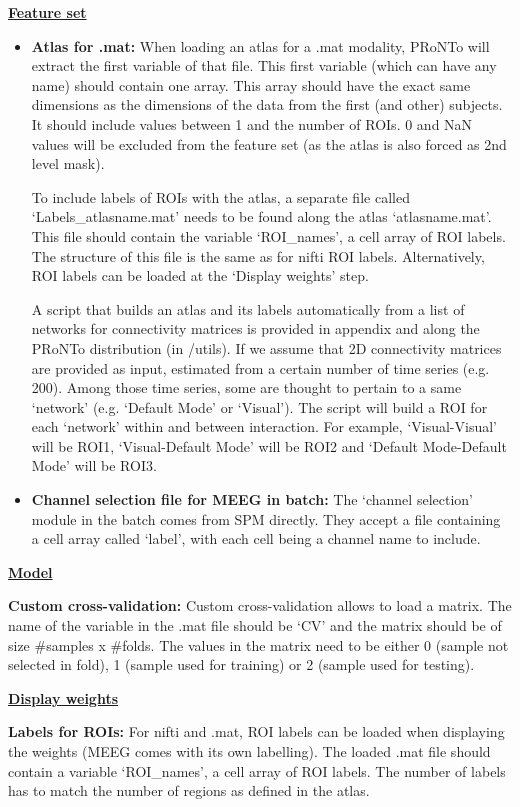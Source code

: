 \noindent \underline{\textbf{Feature set}}

\begin{itemize}

\item \textbf{Atlas for .mat:} When loading an atlas for a .mat modality, PRoNTo will extract the first variable of that file. This first variable (which can have any name) should contain one array. This array should have the exact same dimensions as the dimensions of the data from the first (and other) subjects. It should include values between 1 and the number of ROIs. 0 and NaN values will be excluded from the feature set (as the atlas is also forced as 2nd level mask).

To include labels of ROIs with the atlas, a separate file called `Labels\_atlasname.mat' needs to be found along the atlas `atlasname.mat'. This file should contain the variable `ROI\_names', a cell array of ROI labels. The structure of this file is the same as for nifti ROI labels. Alternatively, ROI labels can be loaded at the `Display weights' step.

A script that builds an atlas and its labels automatically from a list of networks for connectivity matrices is provided in appendix and along the PRoNTo distribution (in /utils). If we assume that 2D connectivity matrices are provided as input, estimated from a certain number of time series (e.g. 200). Among those time series, some are thought to pertain to a same `network' (e.g. `Default Mode' or `Visual'). The script will build a ROI for each `network' within and between interaction. For example, `Visual-Visual' will be ROI1, `Visual-Default Mode' will be ROI2 and `Default Mode-Default Mode' will be ROI3.

\item \textbf{Channel selection file for MEEG in batch:} The `channel selection' module in the batch comes from SPM directly. They accept a file containing a cell array called `label', with each cell being a channel name to include.

\end{itemize}

\noindent \underline{\textbf{Model}}

\bi
\item \textbf{Custom cross-validation:} Custom cross-validation allows to load a matrix. The name of the variable in the .mat file should be `CV' and the matrix should be of size \#samples x \#folds. The values in the matrix need to be either 0 (sample not selected in fold), 1 (sample used for training) or 2 (sample used for testing).
\ei

\noindent \underline{\textbf{Display weights}}

\bi
\item \textbf{Labels for ROIs:}
For nifti and .mat, ROI labels can be loaded when displaying the weights (MEEG comes with its own labelling). The loaded .mat file should contain a variable `ROI\_names', a cell array of ROI labels. The number of labels has to match the number of regions as defined in the atlas.
\ei










